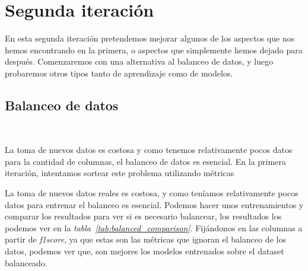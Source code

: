 \section{Segunda iteración}

En esta segunda iteración pretendemos mejorar algunos de los aspectos que nos hemos encontrando en la primera, o aspectos que simplemente hemos dejado para después. Comenzaremos con una alternativa al balanceo de
datos, y luego probaremos otros tipos tanto de aprendizaje como de modelos.

\subsection{Balanceo de datos}\ \label{sec:i2-balance}

La toma de nuevos datos es costosa y como tenemos relativamente pocos datos para la cantidad de columnas, el balanceo de datos es esencial. En la primera iteración, intentamos sortear este problema utilizando métricas
 

La toma de nuevos datos reales es costosa, y como teníamos relativamente pocos datos para entrenar el balanceo es esencial. Podemos hacer unos entrenamientos y comparar los resultados para ver si es necesario 
balancear, los resultados los podemos ver en la \textit{tabla\ \ref{tab:balanced_comparison}}. Fijándonos en las columnas a partir de \textit{f1score}, ya que estas son las métricas que ignoran el balanceo de 
los datos, podemos ver que, son mejores los modelos entrenados sobre el \gls{dataset} balanceado.

